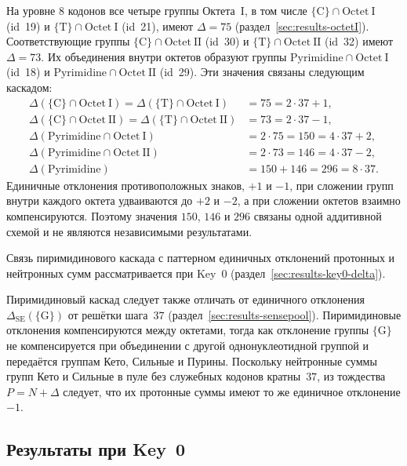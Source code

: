 \documentclass[11pt,a4paper]{article}
\renewcommand{\_}{\origunderscore\allowbreak}
\begin{document}
На уровне $8$ кодонов все четыре группы Октета~I, в том числе
$\{\mathrm{C}\} \cap \mathrm{Octet~I}$ (id~19) и
$\{\mathrm{T}\} \cap \mathrm{Octet~I}$ (id~21), имеют
$\Delta = 75$ (раздел~\ref{sec:results-octetI}). Соответствующие группы
$\{\mathrm{C}\} \cap \mathrm{Octet~II}$ (id~30) и
$\{\mathrm{T}\} \cap \mathrm{Octet~II}$ (id~32) имеют
$\Delta = 73$. Их объединения внутри октетов образуют группы
$\mathrm{Pyrimidine} \cap \mathrm{Octet~I}$ (id~18) и
$\mathrm{Pyrimidine} \cap \mathrm{Octet~II}$ (id~29). Эти значения
связаны следующим каскадом:
\[
\begin{aligned}
\Delta(\{\mathrm{C}\} \cap \mathrm{Octet~I})
  = \Delta(\{\mathrm{T}\} \cap \mathrm{Octet~I})
  &= 75 = 2 \cdot 37 + 1, \\
\Delta(\{\mathrm{C}\} \cap \mathrm{Octet~II})
  = \Delta(\{\mathrm{T}\} \cap \mathrm{Octet~II})
  &= 73 = 2 \cdot 37 - 1, \\
\Delta(\mathrm{Pyrimidine} \cap \mathrm{Octet~I})
  &= 2 \cdot 75 = 150 = 4 \cdot 37 + 2, \\
\Delta(\mathrm{Pyrimidine} \cap \mathrm{Octet~II})
  &= 2 \cdot 73 = 146 = 4 \cdot 37 - 2, \\
\Delta(\mathrm{Pyrimidine})
  &= 150 + 146 = 296 = 8 \cdot 37.
\end{aligned}
\]
Единичные отклонения противоположных знаков, $+1$ и $-1$, при
сложении групп внутри каждого октета удваиваются до $+2$ и $-2$, а при
сложении октетов взаимно компенсируются. Поэтому значения $150$, $146$
и $296$ связаны одной аддитивной схемой и не являются независимыми
результатами.

Связь пиримидинового каскада с паттерном единичных отклонений
протонных и нейтронных сумм рассматривается при Key~0
(раздел~\ref{sec:results-key0-delta}).

Пиримидиновый каскад следует также отличать от единичного отклонения
$\Delta_{\mathrm{SE}}(\{\mathrm{G}\})$ от решётки шага~$37$
(раздел~\ref{sec:results-sensepool}). Пиримидиновые отклонения
компенсируются между октетами, тогда как отклонение группы
$\{\mathrm{G}\}$ не компенсируется при объединении с другой
однонуклеотидной группой и передаётся группам Кето, Сильные и Пурины.
Поскольку нейтронные суммы групп Кето и Сильные в пуле без служебных
кодонов кратны~$37$, из тождества $P=N+\Delta$ следует, что их
протонные суммы имеют то же единичное отклонение $-1$.

\subsection{Результаты при Key~0}
\label{sec:results-key0}
\end{document}
